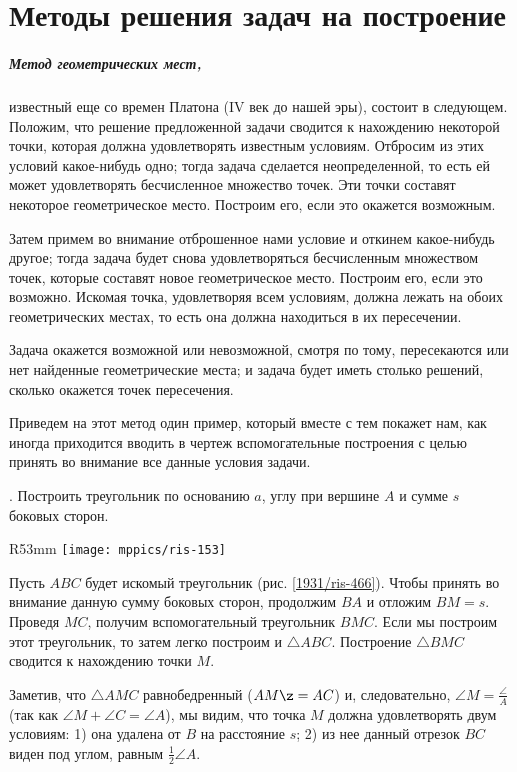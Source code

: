 \appendix
\chapter{Методы решения задач на построение}

\paragraph{Метод геометрических мест,} известный еще со времен Платона (IV век до нашей эры), состоит в следующем.
Положим, что решение предложенной задачи сводится к нахождению некоторой точки, которая должна удовлетворять известным условиям.
Отбросим из этих условий какое-нибудь одно;
тогда задача сделается неопределенной, то есть ей может удовлетворять бесчисленное множество точек.
Эти точки составят некоторое геометрическое место.
Построим его, если это окажется возможным.

Затем примем во внимание отброшенное нами условие и откинем какое-нибудь другое; 
тогда задача будет снова удовлетворяться бесчисленным множеством точек, которые составят новое геометрическое место.
Построим его, если это возможно.
Искомая точка, удовлетворяя всем условиям, должна лежать на обоих геометрических местах, то есть она должна находиться в их пересечении.

Задача окажется возможной или невозможной, смотря по тому, пересекаются или нет найденные геометрические места; и задача будет иметь столько решений, сколько окажется точек пересечения.

Приведем на этот метод один пример, который вместе с тем покажет нам, как иногда приходится вводить в чертеж вспомогательные построения с целью принять во внимание все данные условия задачи.

\smallskip
{}. Построить треугольник по основанию $a$, углу при вершине $A$ и сумме $s$ боковых сторон.

\begin{wrapfigure}{R}{53mm}
\centering
\texttt{[image: mppics/ris-153]}
\caption{}\label{1931/ris-466}
\end{wrapfigure}

Пусть $ABC$ будет искомый треугольник (рис. \ref{1931/ris-466}).
Чтобы принять во внимание данную сумму боковых сторон, продолжим $BA$ и отложим $BM=s$.
Проведя $MC$, получим вспомогательный треугольник $BMC$.
Если мы построим этот треугольник, то затем легко построим и $\triangle ABC$.
Построение $\triangle  BMC$ сводится к нахождению точки $M$.

Заметив, что $\triangle AMC$ равнобедренный ($AM\z=AC$) и, следовательно, $\angle M = \tfrac\angle A$ (так как $\angle M+\angle C= \angle A$), мы видим, что точка $M$ должна удовлетворять двум условиям: 
1) она удалена от $B$ на расстояние $s$; 
2) из нее данный отрезок $BC$ виден под углом, равным $\tfrac12\angle A$. 

